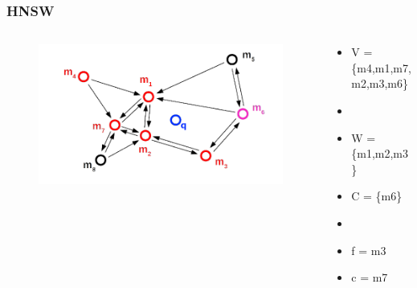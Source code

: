 \documentclass{beamer}
\begin{document}
	\begin{frame}
		\frametitle{HNSW}
		\begin{columns}[T] %
			\begin{column}{.6\textwidth}
				\begin{figure}
					\includegraphics[scale=0.3]{figures/HNSW_b11.png}
				\end{figure}
			\end{column}%
			\hfill%
			\begin{column}{.4\textwidth}
				\begin{itemize}
					\item V = \{m4,m1,m7,m2,m3,m6\}
					\item[]
					\item W = \{m1,m2,m3\}
					\item C = \{m6\}
					\item[]
					\item f = m3
					\item c = m7
				\end{itemize}
			\end{column}%
		\end{columns}
	\end{frame}
\end{document}
